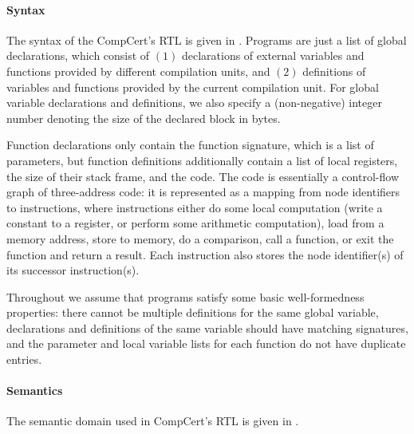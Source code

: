 \paragraph{Syntax}



The syntax of the CompCert's RTL is given in .  Programs are just a list
of global declarations, which consist of $(1)$ declarations of external variables and functions
provided by different compilation units, and $(2)$ definitions of variables and functions provided
by the current compilation unit.  For global variable declarations and definitions, we also specify
a (non-negative) integer number denoting the size of the declared block in bytes.

Function declarations only contain the function signature, which is a list of parameters, but
function definitions additionally contain a list of local registers, the size of their stack frame,
and the code.  The code is essentially a control-flow graph of three-address code: it is represented
as a mapping from node identifiers to instructions, where instructions either
%
do some local computation (\eg write a constant to a register, or perform some arithmetic
computation),
%
load from a memory address, 
%
store to memory,
%
do a comparison,
%
call a function, 
%
or exit the function and return a result. 
%
Each instruction also stores the node identifier(s) of its successor instruction(s).

Throughout we assume that programs satisfy some basic well-formedness properties: there cannot be
multiple definitions for the same global variable, declarations and definitions of the same variable
should have matching signatures, and the parameter and local variable lists for each function do not
have duplicate entries.


\paragraph{Semantics}



The semantic domain used in CompCert's RTL is given in .


